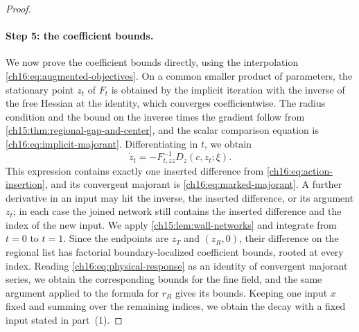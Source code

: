 \begin{proof}
\paragraph{Step 5: the coefficient bounds.}
We now prove the coefficient bounds directly, using the interpolation \eqref{ch16:eq:augmented-objectives}. On a common smaller product of parameters, the stationary point $z_t$ of $F_t$ is obtained by the implicit iteration with the inverse of the free Hessian at the identity, which converges coefficientwise. The radius condition and the bound on the inverse times the gradient follow from \cref{ch15:thm:regional-gap-and-center}, and the scalar comparison equation is \eqref{ch16:eq:implicit-majorant}. Differentiating in $t$, we obtain
\begin{equation}\label{ch16:eq:unperturbed-center-response}
 \dot z_t=-F_{t,zz}^{-1}D_z(c,z_t;\xi).
\end{equation}
This expression contains exactly one inserted difference from \eqref{ch16:eq:action-insertion}, and its convergent majorant is \eqref{ch16:eq:marked-majorant}. A further derivative in an input may hit the inverse, the inserted difference, or its argument $z_t$; in each case the joined network still contains the inserted difference and the index of the new input. We apply \cref{ch15:lem:wall-networks} and integrate from $t=0$ to $t=1$. Since the endpoints are $z_T$ and $(z_R,0)$, their difference on the regional list has factorial boundary-localized coefficient bounds, rooted at every index. Reading \eqref{ch16:eq:physical-response} as an identity of convergent majorant series, we obtain the corresponding bounds for the fine field, and the same argument applied to the formula for $r_R$ gives its bounds. Keeping one input $x$ fixed and summing over the remaining indices, we obtain the decay with a fixed input stated in part~(1).


\end{proof}
